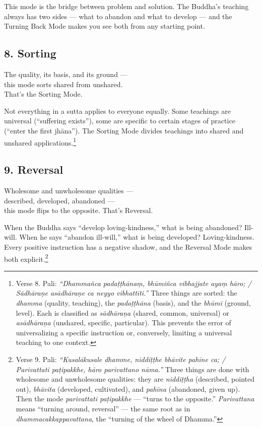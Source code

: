 This mode is the bridge between problem and solution. The Buddha's teaching always has two sides --- what to abandon and what to develop --- and the Turning Back Mode makes you see both from any starting point.

\subsection*{8. Sorting}

\begin{versebox}
The quality, its basis, and its ground ---\\
this mode sorts shared from unshared.\\
That's the Sorting Mode.
\end{versebox}

Not everything in a sutta applies to everyone equally. Some teachings are universal (``suffering exists''), some are specific to certain stages of practice (``enter the first jhāna''). The Sorting Mode divides teachings into shared and unshared applications.\footnote{Verse 8. Pali: \textit{``Dhammañca padaṭṭhānaṃ, bhūmiñca vibhajjate ayaṃ hāro; / Sādhāraṇe asādhāraṇe ca neyyo vibhattīti.''} Three things are sorted: the \textit{dhamma} (quality, teaching), the \textit{padaṭṭhāna} (basis), and the \textit{bhūmi} (ground, level). Each is classified as \textit{sādhāraṇa} (shared, common, universal) or \textit{asādhāraṇa} (unshared, specific, particular). This prevents the error of universalizing a specific instruction or, conversely, limiting a universal teaching to one context.}

\subsection*{9. Reversal}

\begin{versebox}
Wholesome and unwholesome qualities ---\\
described, developed, abandoned ---\\
this mode flips to the opposite. That's Reversal.
\end{versebox}

When the Buddha says ``develop loving-kindness,'' what is being abandoned? Ill-will. When he says ``abandon ill-will,'' what is being developed? Loving-kindness. Every positive instruction has a negative shadow, and the Reversal Mode makes both explicit.\footnote{Verse 9. Pali: \textit{``Kusalākusale dhamme, niddiṭṭhe bhāvite pahīne ca; / Parivattati paṭipakkhe, hāro parivattano nāma.''} Three things are done with wholesome and unwholesome qualities: they are \textit{niddiṭṭha} (described, pointed out), \textit{bhāvita} (developed, cultivated), and \textit{pahīna} (abandoned, given up). Then the mode \textit{parivattati paṭipakkhe} --- ``turns to the opposite.'' \textit{Parivattana} means ``turning around, reversal'' --- the same root as in \textit{dhammacakkappavattana}, the ``turning of the wheel of Dhamma.''}

